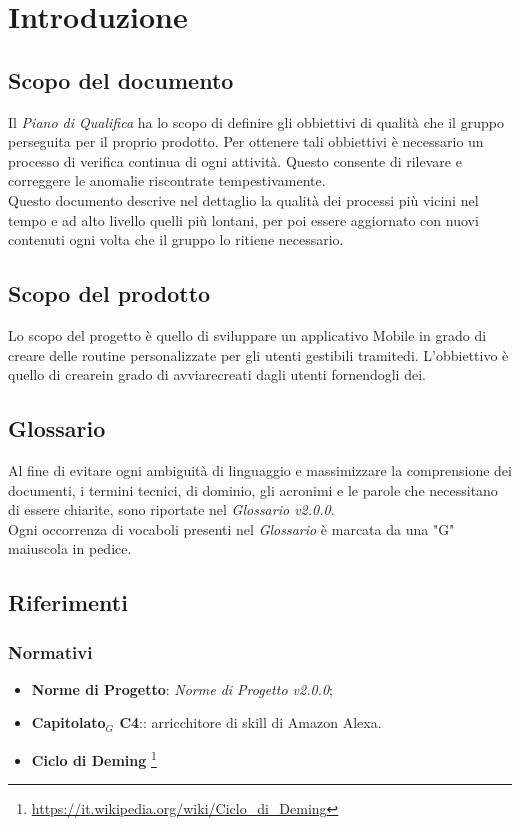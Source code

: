 \chapter{Introduzione}
\label{introduzione}
\section{Scopo del documento}
Il \textit{Piano di Qualifica} ha lo scopo di definire gli obbiettivi di qualità che il gruppo perseguita per il proprio prodotto. Per ottenere tali obbiettivi è necessario un processo di verifica continua di ogni attività. Questo consente di rilevare e correggere le anomalie riscontrate tempestivamente.\\
Questo documento descrive nel dettaglio la qualità dei processi più vicini nel tempo e ad alto livello quelli più lontani, per poi essere aggiornato con nuovi contenuti ogni volta che il gruppo lo ritiene necessario.
\section{Scopo del prodotto}
Lo scopo del progetto è quello di sviluppare un applicativo Mobile in grado di creare delle routine personalizzate per gli utenti gestibili tramitedi. L'obbiettivo è quello di crearein grado di avviarecreati dagli utenti fornendogli dei.
\section{Glossario}
Al fine di evitare ogni ambiguità di linguaggio e massimizzare la comprensione dei documenti, i termini tecnici, di dominio, gli acronimi e le parole che necessitano di essere chiarite, sono riportate nel \textit{Glossario v2.0.0}.\\
Ogni occorrenza di vocaboli presenti nel \textit{Glossario} è marcata da una "G" maiuscola in pedice.
\section{Riferimenti}
\subsection{Normativi}
\begin{itemize}
	\item  \textbf{Norme di Progetto}: \textit{Norme di Progetto v2.0.0};
	\item \textbf{Capitolato$_{G}$ C4}:: arricchitore di skill di Amazon Alexa.
	\item \textbf{Ciclo di Deming}
	\footnote{\url{https://it.wikipedia.org/wiki/Ciclo_di_Deming}}
\end{itemize}
